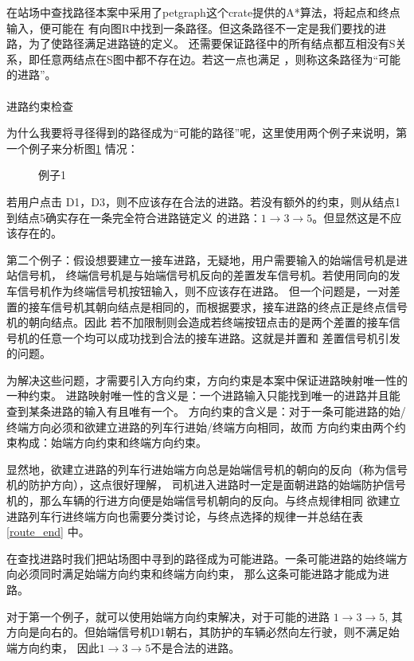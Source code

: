 在站场中查找路径本案中采用了petgraph这个crate提供的A*算法，将起点和终点输入，便可能在
有向图R中找到一条路径。但这条路径不一定是我们要找的进路，为了使路径满足进路链的定义。
还需要保证路径中的所有结点都互相没有S关系，即任意两结点在S图中都不存在边。若这一点也满足
，则称这条路径为“可能的进路”。

\paragraph{}进路约束检查

为什么我要将寻径得到的路径成为“可能的路径”呢，这里使用两个例子来说明，第一个例子来分析图\ref{ens2} 情况：

\begin{figure}[ht]
    \centering
    
    \caption{\label{ens2}例子1}
\end{figure}

若用户点击 D1，D3，则不应该存在合法的进路。若没有额外的约束，则从结点1到结点5确实存在一条完全符合进路链定义
的进路：$1 \rightarrow 3 \rightarrow 5$。但显然这是不应该存在的。

第二个例子：假设想要建立一接车进路，无疑地，用户需要输入的始端信号机是进站信号机，
终端信号机是与始端信号机反向的差置发车信号机。若使用同向的发车信号机作为终端信号机按钮输入，则不应该存在进路。
但一个问题是，一对差置的接车信号机其朝向结点是相同的，而根据要求，接车进路的终点正是终点信号机的朝向结点。因此
若不加限制则会造成若终端按钮点击的是两个差置的接车信号机的任意一个均可以成功找到合法的接车进路。这就是并置和
差置信号机引发的问题。

为解决这些问题，才需要引入方向约束，方向约束是本案中保证进路映射唯一性的一种约束。
进路映射唯一性的含义是：一个进路输入只能找到唯一的进路并且能查到某条进路的输入有且唯有一个。
方向约束的含义是：对于一条可能进路的始/终端方向必须和欲建立进路的列车行进始/终端方向相同，故而
方向约束由两个约束构成：始端方向约束和终端方向约束。

显然地，欲建立进路的列车行进始端方向总是始端信号机的朝向的反向（称为信号机的防护方向），这点很好理解，
司机进入进路时一定是面朝进路的始端防护信号机的，那么车辆的行进方向便是始端信号机朝向的反向。与终点规律相同
欲建立进路列车行进终端方向也需要分类讨论，与终点选择的规律一并总结在表 \ref{route_end} 中。

在查找进路时我们把站场图中寻到的路径成为可能进路。一条可能进路的始终端方向必须同时满足始端方向约束和终端方向约束，
那么这条可能进路才能成为进路。

对于第一个例子，就可以使用始端方向约束解决，对于可能的进路 $1 \rightarrow 3 \rightarrow 5$,
其方向是向右的。但始端信号机D1朝右，其防护的车辆必然向左行驶，则不满足始端方向约束，
因此$1 \rightarrow 3 \rightarrow 5$不是合法的进路。

